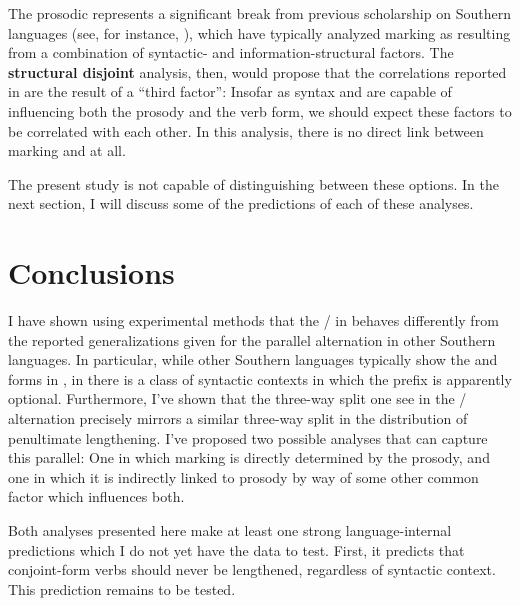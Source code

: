 \documentclass[output=paper,modfonts,nonflat,draftmode]{langsci/langscibook}
\begin{document}
The prosodic  represents a significant break from previous
scholarship on Southern  languages (see, for instance,
\citealt{Buell2005,ChengDowning2009}), which have typically analyzed 
marking as resulting from a combination of syntactic- and
information-structural factors. The \textbf{structural disjoint} analysis,
then, would propose that the correlations reported in
 are the result of a ``third factor'': Insofar
as syntax and  are capable of influencing both the prosody
and the verb form, we should expect these factors to be correlated with each
other. In this analysis, there is no direct link between  marking and
 at all.

The present study is not capable of distinguishing between these options. In
the next section, I will discuss some of the predictions of each of these
analyses.

\section{Conclusions}\label{sec:kusmer:conclusion}


I have shown using experimental methods that the \slash {} in
 behaves differently from the reported generalizations given for the
parallel alternation in other Southern  languages. In particular, while
other Southern  languages typically show the  and  forms
in , in  there is a class of syntactic
contexts in which the  prefix is apparently optional. Furthermore, I've
shown that the three-way split one see in the \slash {} alternation
precisely mirrors a similar three-way split in the distribution of penultimate
lengthening. I've proposed two possible analyses that can capture this
parallel: One in which  marking is directly determined by the prosody,
and one in which it is indirectly linked to prosody by way of some other common
factor which influences both.

Both analyses presented here make at least one strong language-internal
predictions which I do not yet have the data to test. First, it predicts that
conjoint-form verbs should never be lengthened, regardless of syntactic
context. This prediction remains to be tested.
\end{document}

